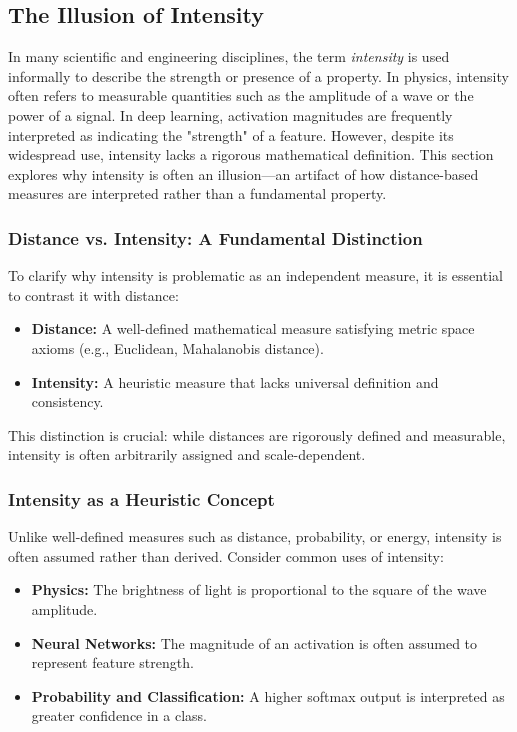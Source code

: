\subsection{The Illusion of Intensity}

In many scientific and engineering disciplines, the term \textit{intensity} is used informally to describe the strength or presence of a property. In physics, intensity often refers to measurable quantities such as the amplitude of a wave or the power of a signal. In deep learning, activation magnitudes are frequently interpreted as indicating the "strength" of a feature. However, despite its widespread use, intensity lacks a rigorous mathematical definition. This section explores why intensity is often an illusion---an artifact of how distance-based measures are interpreted rather than a fundamental property.

\subsubsection{Distance vs. Intensity: A Fundamental Distinction}

To clarify why intensity is problematic as an independent measure, it is essential to contrast it with distance:

\begin{itemize}
    \item \textbf{Distance:} A well-defined mathematical measure satisfying metric space axioms (e.g., Euclidean, Mahalanobis distance).
    \item \textbf{Intensity:} A heuristic measure that lacks universal definition and consistency.
\end{itemize}


This distinction is crucial: while distances are rigorously defined and measurable, intensity is often arbitrarily assigned and scale-dependent. 

\subsubsection{Intensity as a Heuristic Concept}

Unlike well-defined measures such as distance, probability, or energy, intensity is often assumed rather than derived. Consider common uses of intensity:

\begin{itemize}
    \item \textbf{Physics:} The brightness of light is proportional to the square of the wave amplitude.
    \item \textbf{Neural Networks:} The magnitude of an activation is often assumed to represent feature strength.
    \item \textbf{Probability and Classification:} A higher softmax output is interpreted as greater confidence in a class.
\end{itemize}


